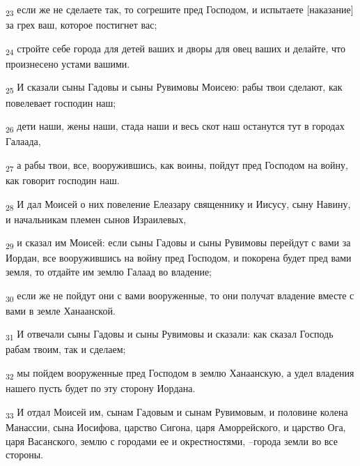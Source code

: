 \begin{tcolorbox}
\textsubscript{23} если же не сделаете так, то согрешите пред Господом, и испытаете [наказание] за грех ваш, которое постигнет вас;
\end{tcolorbox}
\begin{tcolorbox}
\textsubscript{24} стройте себе города для детей ваших и дворы для овец ваших и делайте, что произнесено устами вашими.
\end{tcolorbox}
\begin{tcolorbox}
\textsubscript{25} И сказали сыны Гадовы и сыны Рувимовы Моисею: рабы твои сделают, как повелевает господин наш;
\end{tcolorbox}
\begin{tcolorbox}
\textsubscript{26} дети наши, жены наши, стада наши и весь скот наш останутся тут в городах Галаада,
\end{tcolorbox}
\begin{tcolorbox}
\textsubscript{27} а рабы твои, все, вооружившись, как воины, пойдут пред Господом на войну, как говорит господин наш.
\end{tcolorbox}
\begin{tcolorbox}
\textsubscript{28} И дал Моисей о них повеление Елеазару священнику и Иисусу, сыну Навину, и начальникам племен сынов Израилевых,
\end{tcolorbox}
\begin{tcolorbox}
\textsubscript{29} и сказал им Моисей: если сыны Гадовы и сыны Рувимовы перейдут с вами за Иордан, все вооружившись на войну пред Господом, и покорена будет пред вами земля, то отдайте им землю Галаад во владение;
\end{tcolorbox}
\begin{tcolorbox}
\textsubscript{30} если же не пойдут они с вами вооруженные, то они получат владение вместе с вами в земле Ханаанской.
\end{tcolorbox}
\begin{tcolorbox}
\textsubscript{31} И отвечали сыны Гадовы и сыны Рувимовы и сказали: как сказал Господь рабам твоим, так и сделаем;
\end{tcolorbox}
\begin{tcolorbox}
\textsubscript{32} мы пойдем вооруженные пред Господом в землю Ханаанскую, а удел владения нашего пусть будет по эту сторону Иордана.
\end{tcolorbox}
\begin{tcolorbox}
\textsubscript{33} И отдал Моисей им, сынам Гадовым и сынам Рувимовым, и половине колена Манассии, сына Иосифова, царство Сигона, царя Аморрейского, и царство Ога, царя Васанского, землю с городами ее и окрестностями, --города земли во все стороны.
\end{tcolorbox}
